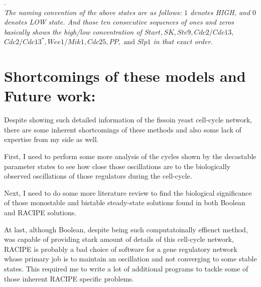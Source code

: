 \documentclass{article}
\begin{document}
. \\
\textit{The naming convention of the above states are as follows: $1$ denotes HIGH, 
and $0$ denotes LOW state. And those ten consecutive sequences of ones and zeros
basically shows the high/low concentration of $Start, SK, Ste9, Cdc2/Cdc13,$ 
$Cdc2/Cdc13^*, Wee1/Mik1, Cdc25, PP, \mbox{ and } Slp1$ in that exact order.}

\section*{Shortcomings of these models and Future work:}
Despite showing such detailed information of the fissoin yeast cell-cycle network,
there are some inherent shortcomings of these methods and also some lack of 
expertise from my side as well. 

First, I need to perform some more analysis of the cycles shown by the decastable 
parameter states to see how close those oscillations are to the biologically 
observed oscillations of those regulators during the cell-cycle. 

Next, I need to do some more literature review to find the biological 
significance of those monostable and bistable steady-state solutions found in
both Boolean and RACIPE solutions.

At last, although Boolean, despite being such computatoinally effienct method, was
capable of providing stark amount of details of this cell-cycle network, 
RACIPE is probably a bad choice of software for a gene regulatory network whose primary 
job is to maintain an oscillation and not converging to some stable states. This 
required me to write a lot of additional programs to tackle some of those 
inherent RACIPE specific problems.
 

\end{document}
